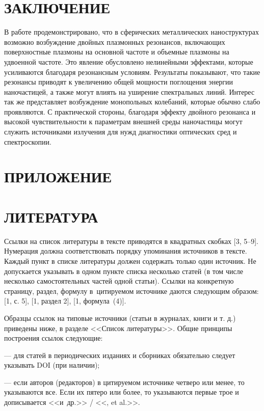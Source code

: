 \documentclass[12pt, a4paper]{article}
\begin{document}
\section{ЗАКЛЮЧЕНИЕ}

В работе продемонстрировано, что в сферических металлических наноструктурах возможно возбуждение двойных плазмонных резонансов, включающих поверхностные плазмоны на основной частоте и объемные плазмоны на удвоенной частоте. Это явление обусловлено нелинейными эффектами, которые усиливаются благодаря резонансным условиям. Результаты показывают, что такие резонансы приводят к увеличению общей мощности поглощения энергии наночастицей, а также могут влиять на уширение спектральных линий. Интерес так же представляет возбуждение монопольных колебаний, которые обычно слабо проявляются. С практической стороны, благодаря эффекту двойного резонанса и высокой чувствительности к параметрам внешней среды наночастицы могут служить источниками излучения для нужд диагностики оптических сред и спектроскопии.

\section{ПРИЛОЖЕНИЕ}

\section{ЛИТЕРАТУРА}

Ссылки на список литературы в тексте приводятся в квадратных скобках [3, 5--9]. Нумерация должна соответствовать порядку упоминания источников в тексте. Каждый пункт в списке литературы должен содержать только один источник. Не допускается указывать в одном пункте списка несколько статей (в том числе несколько самостоятельных частей одной статьи). Ссылки на конкретную страницу, раздел, формулу в~цитируемом источнике даются следующим образом: [1, с. 5], [1, раздел 2], [1, формула~(4)].

Образцы ссылок на типовые источники (статьи в журналах, книги и т. д.) приведены ниже, в разделе <<Список литературы>>. Общие принципы построения ссылок следующие:

--- для статей в периодических изданиях и сборниках обязательно следует указывать DOI (при наличии);

--- если авторов (редакторов) в цитируемом источнике четверо или менее, то указываются все. Если их пятеро или более, то указываются первые трое и дописывается <<и~др.>> / <<, et al.>>.
\end{document}
